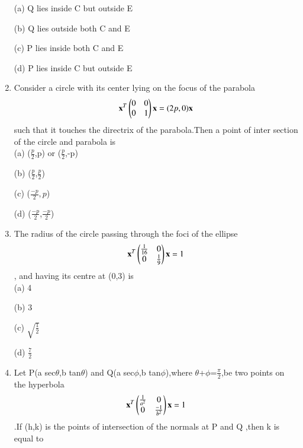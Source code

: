 \documentclass[journal,12pt,twocolumn]{IEEEtran}
\begin{document}
\begin{enumerate}
    \choice (a) Q lies inside C but outside E
    
    \choice (b) Q lies outside both C and E 
    
    \choice (c) P lies inside both C and E 
    
    \choice (d) P lies inside C but outside E\\
    
    \item Consider a circle with its center lying on the focus of the parabola \begin{align}\mathbf x^T \begin{pmatrix}0&0 \\ 0&1\end{pmatrix}\mathbf x=(2p,0)\mathbf x\end{align}  such that it touches the directrix of the parabola.Then a point of inter section of the circle and parabola is\\
    
    \choice (a) ($\frac{p}{2}$,p) or ($\frac{p}{2}$,-p)
    
    \choice (b) ($\frac{p}{2}$,$\frac{p}{2}$)
    
    \choice (c) ($\frac{-p}{2},p$)
    
    \choice (d) ($\frac{-p}{2}$,$\frac{-p}{2}$)\\
    
    \item The radius of the circle passing through the foci of the ellipse \begin{align}\mathbf x^T \begin{pmatrix}\frac{1}{16}&0 \\ 0&\frac{1}{9}\end{pmatrix}\mathbf x=1\end{align}, and having its centre at (0,3) is \\
    
    \choice (a) 4
    
    \choice (b) 3
    
    \choice (c) $\sqrt{\frac{1}{2}}$
    
    \choice (d) $\frac{7}{2}$\\
    
    \item Let P(a sec$\theta$,b tan$\theta$) and Q(a sec$\phi$,b tan$\phi$),where $\theta$+$\phi$=$\frac{\pi}{2}$,be two points on the hyperbola \begin{align}\mathbf x^T \begin{pmatrix} \frac{1}{a^2}&0 \\ 0&\frac{-1}{b^2}\end{pmatrix}\mathbf x=1\end{align}.If (h,k) is the points of intersection of the normals at P and Q ,then k is equal to\\
    

\end{enumerate}
\end{document}
